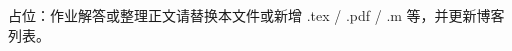 \documentclass{article}
\begin{document}
占位：作业解答或整理正文请替换本文件或新增 .tex / .pdf / .m 等，并更新博客列表。
\end{document}
